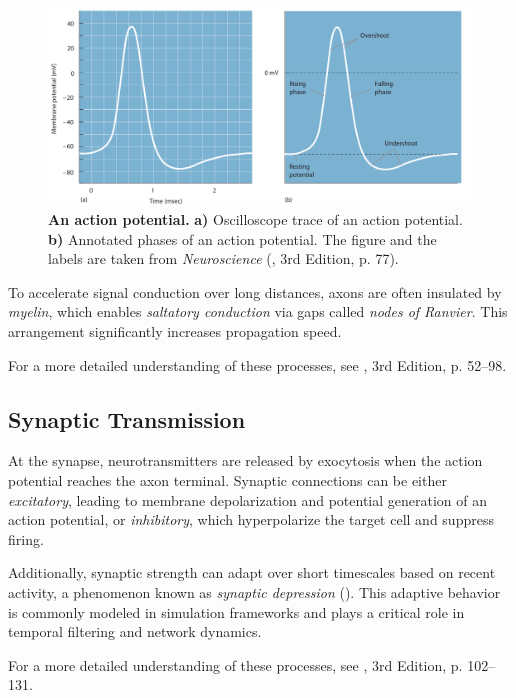 \begin{figure}
    \centering
    \includegraphics[width=\linewidth]{img/action_potential.pdf}
    \caption{\textbf{An action potential.} \textbf{a)} Oscilloscope trace of an action potential. \textbf{b)} Annotated phases of an action potential. The figure and the labels are taken from \emph{Neuroscience} (\citet{bear2020neuroscience}, 3rd Edition, p. 77).}
    \label{fig:action_potential}
\end{figure}

To accelerate signal conduction over long distances, axons are often insulated by \emph{myelin}, which enables \emph{saltatory conduction} via gaps called \emph{nodes of Ranvier}. This arrangement significantly increases propagation speed. 

For a more detailed understanding of these processes, see \citet{bear2020neuroscience}, 3rd Edition, p. 52--98.

\subsection{Synaptic Transmission}
\label{subsec:synaptic_transmission}

At the synapse, neurotransmitters are released by exocytosis when the action potential reaches the axon terminal. Synaptic connections can be either \emph{excitatory}, leading to membrane depolarization and potential generation of an action potential, or \emph{inhibitory}, which hyperpolarize the target cell and suppress firing.

Additionally, synaptic strength can adapt over short timescales based on recent activity, a phenomenon known as \emph{synaptic depression} (\citet{abbott1997syndepression}). This adaptive behavior is commonly modeled in simulation frameworks and plays a critical role in temporal filtering and network dynamics.

For a more detailed understanding of these processes, see \citet{bear2020neuroscience}, 3rd Edition, p. 102--131.


